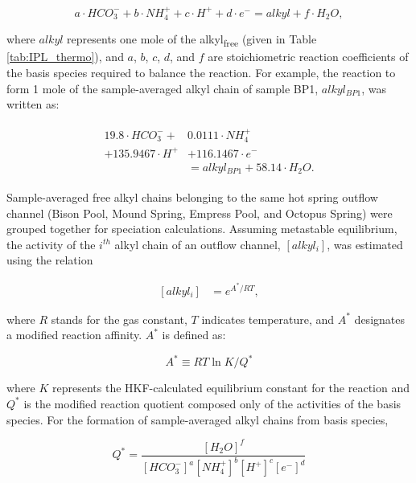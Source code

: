 \begin{equation} \label{eq:basis_formation_IPL}
    a\cdot HCO_{3}^{-} + b\cdot NH_{4}^{+} + c\cdot H^{+} + d\cdot e^{-} = alkyl + f\cdot H_{2}O,
\end{equation}

\noindent where $alkyl$ represents one mole of the alkyl\textsubscript{free} (given in Table \ref{tab:IPL_thermo}), and $a$, $b$, $c$, $d$, and $f$ are stoichiometric reaction coefficients of the basis species required to balance the reaction. For example, the reaction to form 1 mole of the sample-averaged alkyl chain of sample BP1, $alkyl_{BP1}$, was written as:

\begin{align}
\begin{split}
    19.8\cdot HCO_{3}^{-} + &0.0111\cdot NH_{4}^{+}\\
    + 135.9467\cdot H^{+} &+ 116.1467\cdot e^{-}\\
    &= alkyl_{BP1} + 58.14\cdot H_{2}O.
\end{split}
\end{align}

Sample-averaged free alkyl chains belonging to the same hot spring outflow channel (Bison Pool, Mound Spring, Empress Pool, and Octopus Spring) were grouped together for speciation calculations. Assuming metastable equilibrium, the activity of the $i^{th}$ alkyl chain of an outflow channel, $[alkyl_{i}]$, was estimated using the relation

\begin{equation} \label{eq:alkyl_activity}
\begin{split}
[alkyl_{i}] & = e^{A^{*}/RT},
\end{split}
\end{equation}

\noindent where $R$ stands for the gas constant, $T$ indicates temperature, and $A^{*}$ designates a modified reaction affinity. $A^{*}$ is defined as:

\begin{equation}
A^{*} \equiv RT\ln{K/Q^{*}}
\end{equation}

\noindent where $K$ represents the HKF-calculated equilibrium constant for the reaction and $Q^{*}$ is the modified reaction quotient composed only of the activities of the basis species. For the formation of sample-averaged alkyl chains from basis species,

\begin{equation}
Q^{*} = \frac{[H_{2}O]^{f}}{[HCO_{3}^{-}]^{a}[NH_{4}^{+}]^{b}[H^{+}]^{c}[e^{-}]^{d}}
\end{equation}

